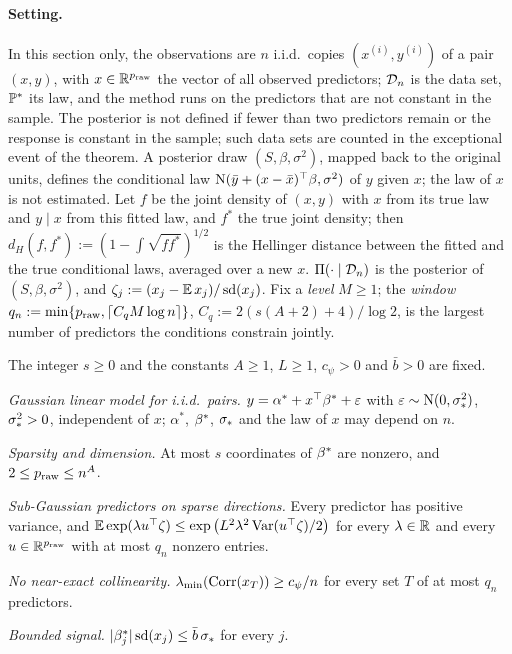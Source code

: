 
\paragraph{Setting.} In this section only, the observations are $n$ i.i.d.\ copies $(x^{(i)},y^{(i)})$ of a pair $(x,y)$,
with $x\in\R^{\praw}$ the vector of all observed predictors; $\Dn$ is the data set, $\P^*$ its law, and the method runs on
the predictors that are not constant in the sample. The posterior is not defined if fewer than two predictors remain or
the response is constant in the sample; such data sets are counted in the exceptional event of the theorem. A posterior draw $(S,\beta,\sigma^2)$, mapped back to the original
units, defines the conditional law $\Normal(\bar y+(x-\bar x)^\top\beta,\sigma^2)$ of $y$ given $x$; the law of $x$ is not
estimated. Let $f$ be the joint density of $(x,y)$ with $x$ from its true law and $y\mid x$ from this fitted law, and $f^*$
the true joint density; then $d_H(f,f^*):=(1-\int\sqrt{ff^*})^{1/2}$ is the Hellinger distance between the fitted and the true conditional
laws, averaged over a new $x$. $\Pi(\cdot\mid\Dn)$ is the posterior of $(S,\beta,\sigma^2)$, and
$\zeta_j:=(x_j-\E x_j)/\sd(x_j)$. Fix a \emph{level} $M\ge1$; the \emph{window} $q_n:=\min\{\praw,\lceil C_qM\log
n\rceil\}$, $C_q:=2(s(A+2)+4)/\log2$, is the largest number of predictors the conditions constrain jointly.

\begin{localassumption}\label{asm:dist}
The integer $s\ge0$ and the constants $A\ge1$, $L\ge1$, $c_\psi>0$ and $\bar b>0$ are fixed.
\begin{asmitems}
  \item\label{asm:dist-model} \emph{Gaussian linear model for i.i.d.\ pairs.} $y=\alpha^*+x^\top\bstar+\varepsilon$ with
    $\varepsilon\sim\Normal(0,\sigs^2)$, $\sigs^2>0$, independent of $x$; $\alpha^*$, $\bstar$, $\sigs$ and the law of $x$ may
    depend on $n$.
  \item\label{asm:dist-sparse} \emph{Sparsity and dimension.} At most $s$ coordinates of $\bstar$ are nonzero, and
    $2\le\praw\le n^A$.
  \item\label{asm:dist-subg} \emph{Sub-Gaussian predictors on sparse directions.} Every predictor has positive variance,
    and $\E\exp(\lambda u^\top\zeta)\le\exp\big(L^2\lambda^2\Var(u^\top\zeta)/2\big)$ for every $\lambda\in\R$ and every
    $u\in\R^{\praw}$ with at most $q_n$ nonzero entries.
  \item\label{asm:dist-nec} \emph{No near-exact collinearity.} $\lmin(\Corr(x_T))\ge c_\psi/n$ for every set $T$ of at
    most $q_n$ predictors.
  \item\label{asm:dist-bs} \emph{Bounded signal.} $\abs{\beta^*_j}\sd(x_j)\le\bar b\,\sigs$ for every $j$.
\end{asmitems}
\end{localassumption}

